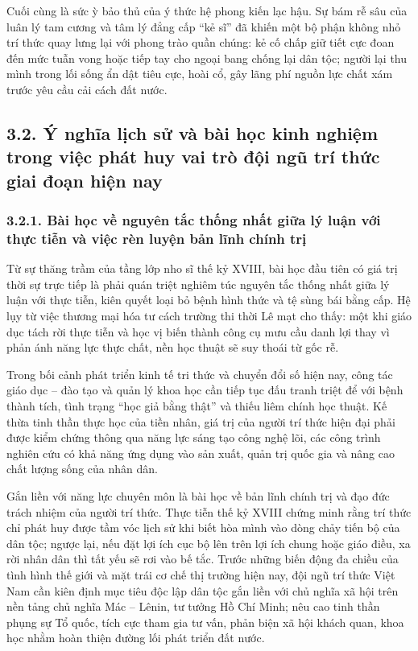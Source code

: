 Cuối cùng là sức ỳ bảo thủ của ý thức hệ phong kiến lạc hậu. Sự bám rễ sâu của luân lý tam cương và tâm lý đẳng cấp ``kẻ sĩ'' đã khiến một bộ phận không nhỏ trí thức quay lưng lại với phong trào quần chúng: kẻ cố chấp giữ tiết cực đoan đến mức tuẫn vong hoặc tiếp tay cho ngoại bang chống lại dân tộc; người lại thu mình trong lối sống ẩn dật tiêu cực, hoài cổ, gây lãng phí nguồn lực chất xám trước yêu cầu cải cách đất nước.

\subsection*{3.2. Ý nghĩa lịch sử và bài học kinh nghiệm trong việc phát huy vai trò đội ngũ trí thức giai đoạn hiện nay}

\subsubsection*{3.2.1. Bài học về nguyên tắc thống nhất giữa lý luận với thực tiễn và việc rèn luyện bản lĩnh chính trị}

Từ sự thăng trầm của tầng lớp nho sĩ thế kỷ XVIII, bài học đầu tiên có giá trị thời sự trực tiếp là phải quán triệt nghiêm túc nguyên tắc thống nhất giữa lý luận với thực tiễn, kiên quyết loại bỏ bệnh hình thức và tệ sùng bái bằng cấp. Hệ lụy từ việc thương mại hóa tư cách trường thi thời Lê mạt cho thấy: một khi giáo dục tách rời thực tiễn và học vị biến thành công cụ mưu cầu danh lợi thay vì phản ánh năng lực thực chất, nền học thuật sẽ suy thoái từ gốc rễ.

Trong bối cảnh phát triển kinh tế tri thức và chuyển đổi số hiện nay, công tác giáo dục -- đào tạo và quản lý khoa học cần tiếp tục đấu tranh triệt để với bệnh thành tích, tình trạng ``học giả bằng thật'' và thiếu liêm chính học thuật. Kế thừa tinh thần thực học của tiền nhân, giá trị của người trí thức hiện đại phải được kiểm chứng thông qua năng lực sáng tạo công nghệ lõi, các công trình nghiên cứu có khả năng ứng dụng vào sản xuất, quản trị quốc gia và nâng cao chất lượng sống của nhân dân.

Gắn liền với năng lực chuyên môn là bài học về bản lĩnh chính trị và đạo đức trách nhiệm của người trí thức. Thực tiễn thế kỷ XVIII chứng minh rằng trí thức chỉ phát huy được tầm vóc lịch sử khi biết hòa mình vào dòng chảy tiến bộ của dân tộc; ngược lại, nếu đặt lợi ích cục bộ lên trên lợi ích chung hoặc giáo điều, xa rời nhân dân thì tất yếu sẽ rơi vào bế tắc. Trước những biến động đa chiều của tình hình thế giới và mặt trái cơ chế thị trường hiện nay, đội ngũ trí thức Việt Nam cần kiên định mục tiêu độc lập dân tộc gắn liền với chủ nghĩa xã hội trên nền tảng chủ nghĩa Mác -- Lênin, tư tưởng Hồ Chí Minh; nêu cao tinh thần phụng sự Tổ quốc, tích cực tham gia tư vấn, phản biện xã hội khách quan, khoa học nhằm hoàn thiện đường lối phát triển đất nước.

